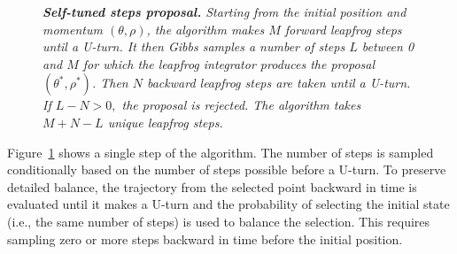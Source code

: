 \documentclass[letterpaper,11pt]{article}
\theoremstyle{plain}%
\theoremstyle{remark}
\begin{document}
\begin{figure}[t]
    \centering
{}
    \caption{\it {\bfseries Self-tuned steps proposal.} Starting from the initial position and momentum $(\theta, \rho)$, the algorithm makes $M$ forward leapfrog steps until a U-turn.  It then Gibbs samples a number of steps $L$ between 0 and $M$ for which the leapfrog integrator produces the proposal $(\theta^*, \rho^*)$.  Then $N$ backward leapfrog steps are taken until a U-turn.
    If $L - N > 0,$ the proposal is rejected.  The algorithm takes $M + N - L$ unique leapfrog steps.}
    \label{fig:adaptive-u-turns}
\end{figure}  
Figure~\ref{fig:adaptive-u-turns} shows a single step of the algorithm.  The number of steps is sampled conditionally based on the number of steps possible before a U-turn.  To preserve detailed balance, the trajectory from the selected point backward in time is evaluated until it makes a U-turn and the probability of selecting the initial state (i.e., the same number of steps) is used to balance the selection.  This requires sampling zero or more steps backward in time before the initial position.
\end{document}
